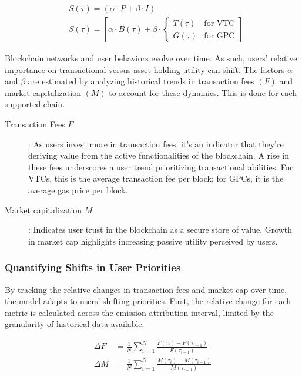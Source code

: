 \documentclass[11pt]{report}
\begin{document}
\begin{align}
     & S(\tau) = (\alpha \cdot P + \beta \cdot I)                                  \\
     & S(\tau) = \left[\alpha \cdot B(\tau) + \beta \cdot \begin{cases}
                                                                  T(\tau) & \text{for VTC} \\
                                                                  G(\tau) & \text{for GPC}
                                                              \end{cases}\right]
    \label{eq:attribution_factors}
\end{align}



Blockchain networks and user behaviors evolve over time. As such, users' relative importance on transactional versus asset-holding utility can shift. The factors $\alpha$ and $\beta$ are estimated by analyzing historical trends in transaction fees $(F)$ and market capitalization $(M)$ to account for these dynamics. This is done for each supported chain.

\begin{description}
    \item[Transaction Fees $F$]: As users invest more in transaction fees, it's an indicator that they're deriving value from the active functionalities of the blockchain. A rise in these fees underscores a user trend prioritizing transactional abilities. For \ac{VTC}s, this is the average transaction fee per block; for \ac{GPC}s, it is the average gas price per block.
    \item[Market capitalization $M$]: Indicates user trust in the blockchain as a secure store of value. Growth in market cap highlights increasing passive utility perceived by users.
\end{description}

\subsubsection{Quantifying Shifts in User Priorities}

By tracking the relative changes in transaction fees and market cap over time, the model adapts to users' shifting priorities. First, the relative change for each metric is calculated across the emission attribution interval, limited by the granularity of historical data available.

\begin{align}
    \bar{\Delta F} & = \frac{1}{N}\sum_{i=1}^{N}\frac{F(\tau_i) - F(\tau_{i-1})}{F(\tau_{i-1})} \\
    \bar{\Delta M} & = \frac{1}{N}\sum_{i=1}^{N}\frac{M(\tau_i) - M(\tau_{i-1})}{M(\tau_{i-1})}
\end{align}
\end{document}
